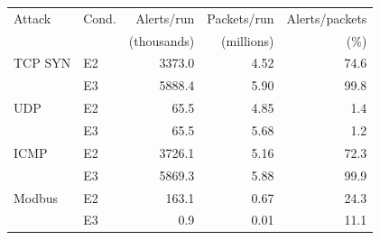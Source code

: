 \begin{tabular}{llrrr}
\toprule
Attack & Cond. & Alerts/run & Packets/run & Alerts/packets\\
 & & (thousands) & (millions) & (\%)\\
\midrule
TCP SYN & E2 & 3373.0 & 4.52 & 74.6\\
 & E3 & 5888.4 & 5.90 & 99.8\\
\midrule
UDP & E2 & 65.5 & 4.85 & 1.4\\
 & E3 & 65.5 & 5.68 & 1.2\\
\midrule
ICMP & E2 & 3726.1 & 5.16 & 72.3\\
 & E3 & 5869.3 & 5.88 & 99.9\\
\midrule
Modbus & E2 & 163.1 & 0.67 & 24.3\\
 & E3 & 0.9 & 0.01 & 11.1\\
\bottomrule
\end{tabular}
